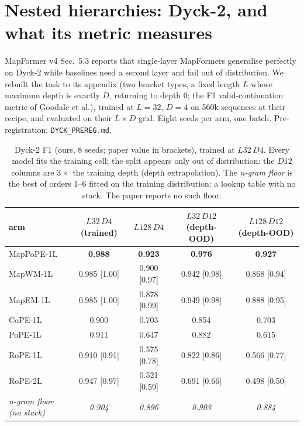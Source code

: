 \documentclass[10pt]{article}
\begin{document}
\section{Nested hierarchies: Dyck-2, and what its metric measures}
\label{sec:dyck}

MapFormer v4 Sec.~5.3 reports that single-layer MapFormers generalise perfectly on Dyck-2 while baselines
need a second layer and fail out of distribution. We rebuilt the task to its appendix (two bracket types,
a fixed length $L$ whose maximum depth is exactly $D$, returning to depth 0; the F1 valid-continuation
metric of Goodale et al.), trained at $L=32$, $D=4$ on 560k sequences at their recipe, and evaluated on
their $L\times D$ grid. Eight seeds per arm, one batch. Pre-registration: \texttt{DYCK\_PREREG.md}.

\begin{table}[h]\centering\footnotesize
\caption{Dyck-2 F1 (ours, 8 seeds; paper value in brackets), trained at $L32\,D4$. Every model fits the training cell; the
split appears only out of distribution: the $D12$ columns are $3\times$ the training depth (depth extrapolation). The \emph{n-gram floor} is the best of orders 1--6 fitted on the
training distribution: a lookup table with no stack. The paper reports no such floor.}
\begin{tabular}{lcccc}
\toprule
arm & $L32\,D4$ (trained) & $L128\,D4$ & $L32\,D12$ (depth-OOD) & $L128\,D12$ (depth-OOD) \\
\midrule
MapPoPE-1L & \textbf{0.988} & \textbf{0.923} & \textbf{0.976} & \textbf{0.927} \\
MapWM-1L & 0.985 [1.00] & 0.900 [0.97] & 0.942 [0.98] & 0.868 [0.94] \\
MapEM-1L & 0.985 [1.00] & 0.878 [0.99] & 0.949 [0.98] & 0.888 [0.95] \\
CoPE-1L & 0.900 & 0.703 & 0.854 & 0.703 \\
PoPE-1L & 0.911 & 0.647 & 0.882 & 0.615 \\
RoPE-1L & 0.910 [0.91] & 0.575 [0.78] & 0.822 [0.86] & 0.566 [0.77] \\
RoPE-2L & 0.947 [0.97] & 0.521 [0.59] & 0.691 [0.66] & 0.498 [0.50] \\
\midrule
\emph{n-gram floor (no stack)} & \emph{0.904} & \emph{0.896} & \emph{0.903} & \emph{0.884} \\
\bottomrule
\end{tabular}
\label{tab:dyck}
\end{table}
\end{document}
